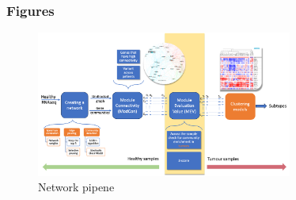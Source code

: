 \subsubsection{Figures} 


\begin{figure}[!htb]
    \centering\includegraphics[width=0.75\textwidth,height=0.75\textheight,keepaspectratio]{Sections/Network_I/Resources/Methods/network_pipeline.png}
    \caption{Network pipene}
    \label{fig:N_I:network_pipeline}
\end{figure}








